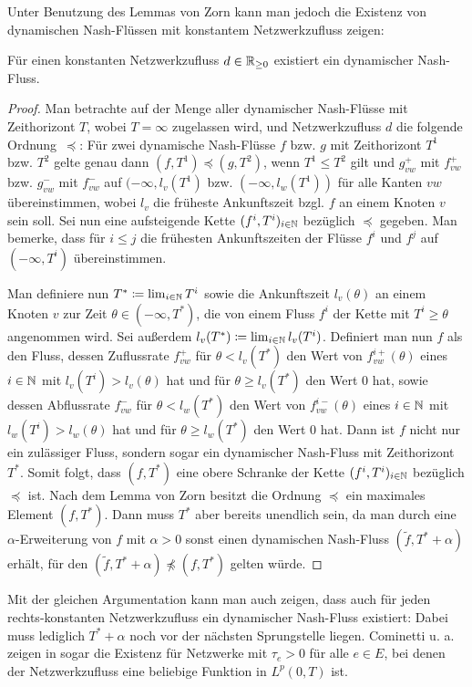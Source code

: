 Unter Benutzung des Lemmas von Zorn kann man jedoch die Existenz von dynamischen Nash-Flüssen mit konstantem Netzwerkzufluss zeigen:

\begin{theorem}
	Für einen konstanten Netzwerkzufluss $d\in\mathbb{R}_{\geq 0}$ existiert ein dynamischer Nash-Fluss.
\end{theorem}
\begin{proof}
	Man betrachte auf der Menge aller dynamischer Nash-Flüsse mit Zeithorizont $T$, wobei $T=\infty$ zugelassen wird, und Netzwerkzufluss $d$ die folgende Ordnung~$\preceq$:
	Für zwei dynamische Nash-Flüsse $f$ bzw. $g$ mit Zeithorizont $T^1$ bzw. $T^2$ gelte genau dann $(f, T^1)\preceq (g, T^2)$, wenn $T^1 \leq T^2$ gilt und $g^+_{vw}$ mit $f^+_{vw}$ bzw. $g^-_{vw}$ mit $f^-_{vw}$ auf $(-\infty, l_v(T^1)$ bzw. $(-\infty, l_w(T^1))$ für alle Kanten $vw$ übereinstimmen, wobei $l_v$ die früheste Ankunftszeit bzgl. $f$ an einem Knoten $v$ sein soll.
	Sei nun eine aufsteigende Kette $(f^i, T^i)_{i\in\mathbb{N}}$ bezüglich $\preceq$ gegeben.
	Man bemerke, dass für $i\leq j$ die frühesten Ankunftszeiten der Flüsse $f^i$ und $f^j$ auf $(-\infty, T^i)$ übereinstimmen.
	
	Man definiere nun $T^* \coloneq \lim_{i\in\mathbb{N}} T^i$ sowie die Ankunftszeit $l_v(\theta)$ an einem Knoten $v$ zur Zeit $\theta\in(-\infty, T^*)$, die von einem Fluss $f^i$ der Kette mit $T^i \geq \theta$ angenommen wird.
	Sei außerdem $l_v(T^*) \coloneq \lim_{i\in\mathbb{N}} l_v(T^i)$.
	Definiert man nun $f$ als den Fluss, dessen Zuflussrate $f_{vw}^+$ für $\theta<l_v(T^*)$ den Wert von $f^{i+}_{vw}(\theta)$ eines $i\in\mathbb{N}$ mit $l_v(T^i) > l_v(\theta)$ hat und für $\theta \geq l_v(T^*)$ den Wert $0$ hat, sowie dessen Abflussrate $f_{vw}^-$ für $\theta<l_w(T^*)$ den Wert von $f^{i-}_{vw}(\theta)$ eines $i\in\mathbb{N}$ mit $l_w(T^i) > l_w(\theta)$ hat und für $\theta \geq l_w(T^*)$ den Wert $0$ hat.
	Dann ist $f$ nicht nur ein zulässiger Fluss, sondern sogar ein dynamischer Nash-Fluss mit Zeithorizont $T^*$.
	Somit folgt, dass $(f, T^*)$ eine obere Schranke der Kette $(f^i, T^i)_{i\in\mathbb{N}}$ bezüglich $\preceq$ ist.
	Nach dem Lemma von Zorn besitzt die Ordnung $\preceq$ ein maximales Element $(f, T^*)$.
	Dann muss $T^*$ aber bereits unendlich sein, da man durch eine $\alpha$-Erweiterung von $f$ mit $\alpha > 0$ sonst einen dynamischen Nash-Fluss $(\tilde{f}, T^* + \alpha)$ erhält, für den $(\tilde{f}, T^* + \alpha) \npreceq (f, T^*)$ gelten würde.
\end{proof}

Mit der gleichen Argumentation kann man auch zeigen, dass auch für jeden rechts-konstanten Netzwerkzufluss ein dynamischer Nash-Fluss existiert:
Dabei muss lediglich $T^* + \alpha$ noch vor der nächsten Sprungstelle liegen.
Cominetti u. a. zeigen in \cite{Cominetti2015} sogar die Existenz für Netzwerke mit $\tau_e > 0$ für alle $e\in E$, bei denen der Netzwerkzufluss eine beliebige Funktion in $L^p(0,T)$ ist.